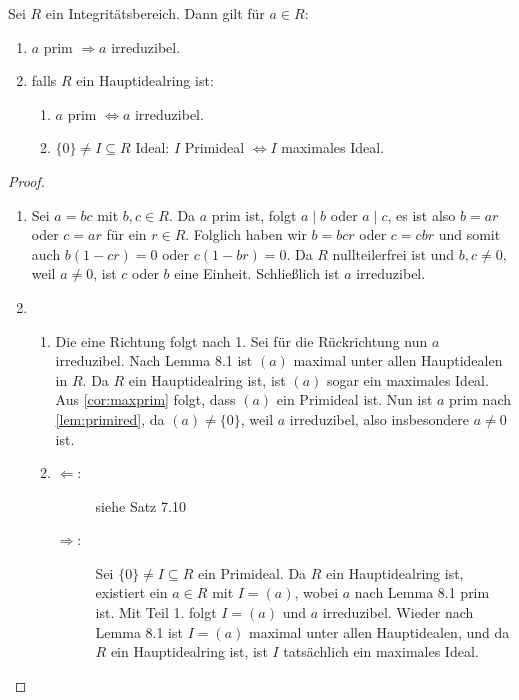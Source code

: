 \documentclass[12pt,a4paper]{scrartcl}
\begin{document}
\begin{satz} Sei $R$ ein Integritätsbereich. Dann gilt für $a\in R$: \begin{enumerate}
		\item $a$ prim $\Longrightarrow a$ irreduzibel.
		\item falls $R$ ein Hauptidealring ist:
		\begin{enumerate}
			\item $a$ prim $\Longleftrightarrow a$ irreduzibel.
			\item $\{0\}\neq I\subseteq R$ Ideal: $I$ Primideal $\Longleftrightarrow I$ maximales Ideal.
		\end{enumerate}
	\end{enumerate}
\end{satz}
\begin{proof}
	\leavevmode
	\begin{enumerate}
		\item Sei $a = bc$ mit $b,c \in R$. Da $a$ prim ist, folgt $a\mid b$ oder $a \mid c$, es ist also $b = ar$ oder $c = ar$ für ein $r\in R$.  Folglich haben wir $b = bcr$ oder $c = cbr$ und somit auch $b(1-cr)=0$ oder $c(1-br)=0$. Da $R$ nullteilerfrei ist und $b,c \neq 0$, weil $a \neq 0$, ist $c$ oder $b$ eine Einheit. Schließlich ist $a$ irreduzibel.
		
		\item \begin{enumerate}
			\item Die eine Richtung folgt nach 1. Sei für die Rückrichtung nun $a$ irreduzibel. Nach Lemma 8.1 ist $(a)$ maximal unter allen Hauptidealen in $R$. Da $R$ ein Hauptidealring ist, ist $(a)$ sogar ein maximales Ideal. Aus \cref{cor:maxprim} folgt, dass $(a)$ ein Primideal ist. Nun ist $a$ prim nach \cref{lem:primired}, da $(a)\neq\{0\}$, weil $a$ irreduzibel, also insbesondere $a\neq 0$ ist.
			
			\item \begin{description}
					\item[\glqq$\Leftarrow$\grqq:] siehe Satz 7.10
					\item[\glqq$\Rightarrow$\grqq:] Sei $\{0\}\neq I\subseteq R$ ein Primideal. Da $R$ ein Hauptidealring ist, existiert ein $a\in R$ mit $I = (a)$, wobei $a$ nach Lemma 8.1 prim ist. Mit Teil 1. folgt $I = (a)$ und $a$ irreduzibel. Wieder nach Lemma 8.1 ist $I = (a) $ maximal unter allen Hauptidealen, und da $R$ ein Hauptidealring ist, ist $I$ tatsächlich ein maximales Ideal.
					\end{description}
			\end{enumerate}
	\end{enumerate}
\end{proof}
\end{document}
